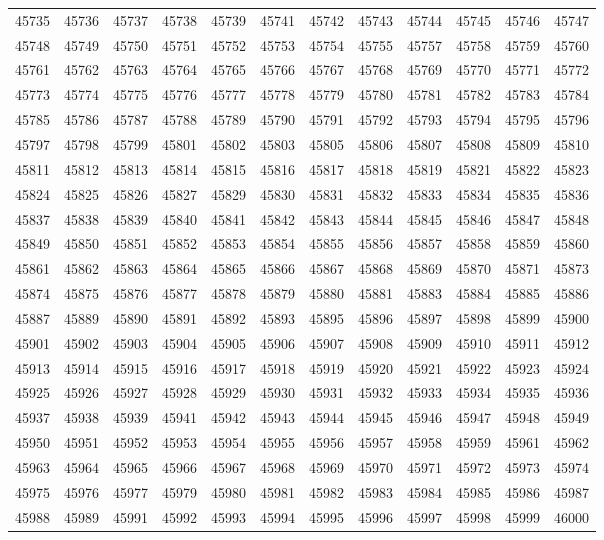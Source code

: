 \begin{center}
\begin{longtable}{llllllllllll}
45735 &45736 &45737 &45738 &45739 &45741 &45742 &45743 &45744 &45745 &45746 &45747 \\
45748 &45749 &45750 &45751 &45752 &45753 &45754 &45755 &45757 &45758 &45759 &45760 \\
45761 &45762 &45763 &45764 &45765 &45766 &45767 &45768 &45769 &45770 &45771 &45772 \\
45773 &45774 &45775 &45776 &45777 &45778 &45779 &45780 &45781 &45782 &45783 &45784 \\
45785 &45786 &45787 &45788 &45789 &45790 &45791 &45792 &45793 &45794 &45795 &45796 \\
45797 &45798 &45799 &45801 &45802 &45803 &45805 &45806 &45807 &45808 &45809 &45810 \\
45811 &45812 &45813 &45814 &45815 &45816 &45817 &45818 &45819 &45821 &45822 &45823 \\
45824 &45825 &45826 &45827 &45829 &45830 &45831 &45832 &45833 &45834 &45835 &45836 \\
45837 &45838 &45839 &45840 &45841 &45842 &45843 &45844 &45845 &45846 &45847 &45848 \\
45849 &45850 &45851 &45852 &45853 &45854 &45855 &45856 &45857 &45858 &45859 &45860 \\
45861 &45862 &45863 &45864 &45865 &45866 &45867 &45868 &45869 &45870 &45871 &45873 \\
45874 &45875 &45876 &45877 &45878 &45879 &45880 &45881 &45883 &45884 &45885 &45886 \\
45887 &45889 &45890 &45891 &45892 &45893 &45895 &45896 &45897 &45898 &45899 &45900 \\
45901 &45902 &45903 &45904 &45905 &45906 &45907 &45908 &45909 &45910 &45911 &45912 \\
45913 &45914 &45915 &45916 &45917 &45918 &45919 &45920 &45921 &45922 &45923 &45924 \\
45925 &45926 &45927 &45928 &45929 &45930 &45931 &45932 &45933 &45934 &45935 &45936 \\
45937 &45938 &45939 &45941 &45942 &45943 &45944 &45945 &45946 &45947 &45948 &45949 \\
45950 &45951 &45952 &45953 &45954 &45955 &45956 &45957 &45958 &45959 &45961 &45962 \\
45963 &45964 &45965 &45966 &45967 &45968 &45969 &45970 &45971 &45972 &45973 &45974 \\
45975 &45976 &45977 &45979 &45980 &45981 &45982 &45983 &45984 &45985 &45986 &45987 \\
45988 &45989 &45991 &45992 &45993 &45994 &45995 &45996 &45997 &45998 &45999 &46000 \\

\end{longtable}
\end{center}
